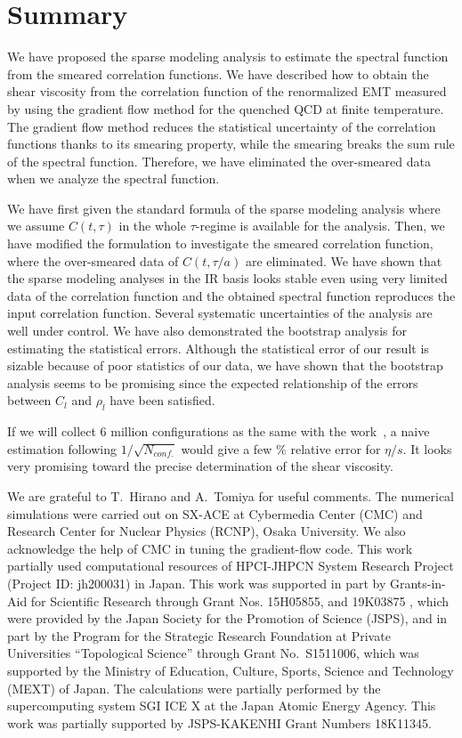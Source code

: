 \documentclass[a4paper,11pt]{article}
\begin{document}
\section{Summary}\label{sec:summary}
We have proposed the sparse modeling analysis to estimate the spectral function from the smeared correlation functions.
We have described how to obtain the shear viscosity from the correlation function of the renormalized EMT measured by using the gradient flow method for the quenched QCD at  finite temperature.
The gradient flow method reduces the statistical uncertainty of the correlation functions thanks to its smearing property,
while the smearing breaks the sum rule of the spectral function.
 Therefore, we have eliminated the over-smeared data  when we analyze the spectral function.

We have first given the standard formula of the sparse modeling analysis where we assume  $C(t,\tau)$ in the whole $\tau$-regime is available for the analysis.
Then, we have modified the formulation to investigate the smeared correlation function, where the over-smeared data of $C(t,\tau/a)$ are eliminated.
We have shown that the sparse modeling analyses in the IR basis looks stable even using very limited data of the correlation function and the obtained spectral function reproduces the input correlation function.
Several systematic uncertainties of the analysis are well under control. 
We have also demonstrated the bootstrap analysis for estimating the statistical errors.
Although the statistical error of our result is sizable because of poor statistics of our data, we have shown that the bootstrap analysis seems to be promising since the expected relationship of the errors between $C_l$ and $\rho_l$ have been satisfied.

If we will collect $6$ million configurations as the same with the work~\cite{Pasztor:2018yae}, a naive estimation following $1/\sqrt{N_{conf.}}$ would give a few $\%$ relative error for $\eta/s$.
It looks very promising toward the precise determination of the shear viscosity.



\acknowledgments
We are grateful to  T.~Hirano and A.~Tomiya for useful comments.
The numerical simulations were carried out on SX-ACE 
 at Cybermedia Center (CMC) and Research Center for Nuclear Physics (RCNP), 
Osaka University.
We also acknowledge the help of CMC in tuning the gradient-flow code.
This work partially used computational resources of
 HPCI-JHPCN System Research Project (Project ID: jh200031) in Japan.
 This work was supported in part by Grants-in-Aid for Scientific Research 
through Grant Nos.
 15H05855,%
and 19K03875%
, which were 
provided by the Japan Society for the Promotion of Science (JSPS), and in part 
by the Program for the Strategic Research Foundation at Private Universities 
``Topological Science'' through Grant No.\ S1511006, which was supported by the
Ministry of Education, Culture, Sports, Science and Technology (MEXT) of 
Japan.
The calculations were partially performed by the supercomputing system SGI ICE X at the Japan Atomic Energy Agency.
This work was partially supported by JSPS-KAKENHI Grant Numbers 18K11345.
\end{document}
